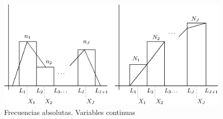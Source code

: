 \documentclass[12pt]{report}
\begin{document}
\begin{figure}
\begin{center}
\includegraphics{frecuencias.eps}
\end{center}
\caption{Frecuencias absolutas. Variables continuas} \label{FAAVQC}
\end{figure}
\end{document}
